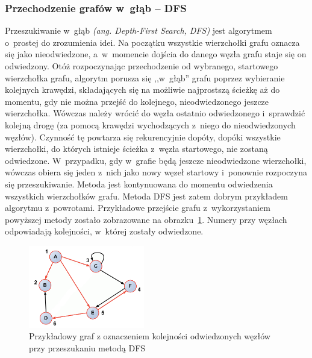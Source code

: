 \documentclass[twoside,12pt]{report}
\begin{document}
\subsubsection{Przechodzenie grafów w~głąb – DFS}
Przeszukiwanie w~głąb \textit{(ang. Depth-First Search, DFS)} jest algorytmem o~prostej do zrozumienia idei. Na początku wszystkie wierzchołki grafu oznacza się jako nieodwiedzone, a~w~momencie dojścia do danego węzła grafu staje się on odwiedzony. Otóż rozpoczynając przechodzenie od wybranego, startowego wierzchołka grafu, algorytm porusza się ,,w~głąb'' grafu poprzez wybieranie kolejnych krawędzi, składających się na możliwie najprostszą ścieżkę aż do momentu, gdy nie można przejść do kolejnego, nieodwiedzonego jeszcze wierzchołka. Wówczas należy wrócić do węzła ostatnio odwiedzonego i~sprawdzić kolejną drogę (za pomocą krawędzi wychodzących z~niego do nieodwiedzonych węzłów). Czynność tę powtarza się rekurencyjnie dopóty, dopóki wszystkie wierzchołki, do których istnieje ścieżka z~węzła startowego, nie zostaną odwiedzone. W~przypadku, gdy w~grafie będą jeszcze nieodwiedzone wierzchołki, wówczas obiera się jeden z~nich jako nowy węzeł startowy i~ponownie rozpoczyna się przeszukiwanie. Metoda jest kontynuowana do momentu odwiedzenia wszystkich wierzchołków grafu. Metoda DFS jest zatem dobrym przykładem algorytmu z~powrotami. Przykładowe przejście grafu z~wykorzystaniem powyższej metody zostało zobrazowane na obrazku~\ref{fig:dfs}. Numery przy węzłach odpowiadają kolejności, w~której zostały odwiedzone.

\begin{figure}[htbp]
	\centering
	\includegraphics[width=0.45\textwidth]{img/dfs}
	\caption{Przykładowy graf z oznaczeniem kolejności odwiedzonych węzłów przy przeszukaniu metodą DFS}
	\label{fig:dfs}
\end{figure}
\end{document}
